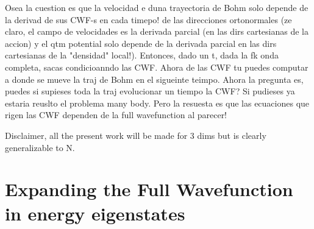\documentclass[11pt, a4paper]{article} %
\begin{document}
Osea la cuestion es que la velocidad e duna trayectoria de Bohm solo depende de la derivad de sus CWF-s en cada timepo! de las direcciones ortonormales (ze claro, el campo de velocidades es la derivada parcial (en las dirs cartesianas de la accion) y el qtm potential solo depende de la derivada parcial en las dirs cartesianas de la "densidad" local!). Entonces, dado un t, dada la fk onda completa, sacas condicioanndo las CWF. Ahora de las CWF tu puedes computar a donde se mueve la traj de Bohm en el sigueinte teimpo. Ahora la pregunta es, puedes si supieses toda la traj evolucionar un tiempo la CWF? Si pudieses ya estaria reuslto el problema many body. Pero la resuesta es que las ecuaciones que rigen las CWF dependen de la full wavefunction al parecer!

Disclaimer, all the present work will be made for 3 dims but is clearly generalizable to N.
\newpage
\section{Expanding the Full Wavefunction in energy eigenstates}
\end{document}
